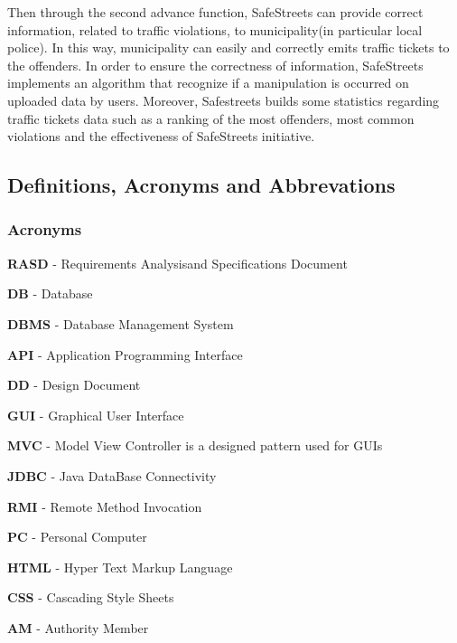 \documentclass[12pt]{article}
\begin{document}
Then through the second advance function, SafeStreets can provide correct information, related to traffic violations, to municipality(in particular local police). In this way, municipality can easily and correctly emits traffic tickets to the offenders. In order to ensure the correctness of information, SafeStreets implements an algorithm that recognize if a manipulation is occurred on uploaded data by users. Moreover, Safestreets builds some statistics regarding traffic tickets data such as a ranking of the most offenders, most common violations and the effectiveness of SafeStreets initiative.
\vspace{1cm}

\newpage
\subsection{Definitions, Acronyms and Abbrevations}
\vspace{5mm}
\subsubsection{Acronyms}
\vspace{5mm}

\begin{flushleft}

\textbf{RASD} - Requirements Analysisand Specifications Document
\vspace{3mm}

\textbf{DB} - Database
\vspace{3mm}

\textbf{DBMS} - Database Management System
\vspace{3mm}

\textbf{API} - Application Programming Interface
\vspace{3mm}

\textbf{DD} - Design Document
\vspace{3mm}

\textbf{GUI} - Graphical User Interface
\vspace{3mm}

\textbf{MVC} - Model View Controller is a designed pattern used for GUIs
\vspace{3mm}

\textbf{JDBC} - Java DataBase Connectivity
\vspace{3mm}

\textbf{RMI} - Remote Method Invocation
\vspace{3mm}

\textbf{PC} - Personal Computer
\vspace{3mm}

\textbf{HTML} - Hyper Text Markup Language
\vspace{3mm}

\textbf{CSS} - Cascading Style Sheets
\vspace{3mm}

\textbf{AM} - Authority Member
\vspace{3mm}

\end{flushleft}
\end{document}

